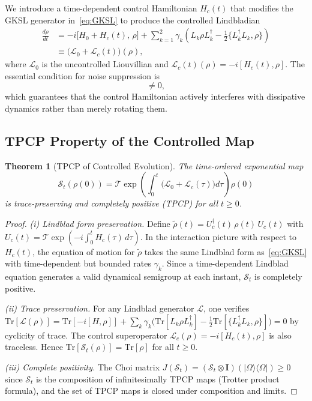 \documentclass[journal,twocolumn]{IEEEtran}
\theoremstyle{definition}
\theoremstyle{plain}
\newtheorem{theorem}{Theorem}[section]
\newcommand{\tensor}{\otimes}
\newcommand{\Tr}{\mathrm{Tr}}
\begin{document}
We introduce a time-dependent control Hamiltonian $H_c(t)$ that
modifies the GKSL generator in~\eqref{eq:GKSL} to produce the
controlled Lindbladian
\begin{align}
  \frac{d\rho}{dt} &= -i\bigl[H_0 + H_c(t),\, \rho\bigr]
  + \sum_{k=1}^2 \gamma_k\!\left(L_k\rho L_k^\dagger
    - \tfrac{1}{2}\{L_k^\dagger L_k, \rho\}\right) \nonumber\\
  &\equiv \bigl(\mathcal{L}_0 + \mathcal{L}_c(t)\bigr)(\rho),
  \label{eq:controlled_dynamics}
\end{align}
where $\mathcal{L}_0$ is the uncontrolled Liouvillian and
$\mathcal{L}_c(t)(\rho) = -i[H_c(t), \rho]$.  The essential
condition for noise suppression is
\begin{equation}
  [\mathcal{L}_0,\, \mathcal{L}_c(t)] \ne 0,
  \label{eq:noncommutativity}
\end{equation}
which guarantees that the control Hamiltonian actively interferes
with dissipative dynamics rather than merely rotating them.

\subsection{TPCP Property of the Controlled Map}

\begin{theorem}[TPCP of Controlled Evolution]
\label{thm:tpcp}
The time-ordered exponential map
\begin{equation}
  \mathcal{S}_t(\rho(0)) = \mathcal{T}\!\exp\!\left(
    \int_0^t \bigl(\mathcal{L}_0 + \mathcal{L}_c(\tau)\bigr)
    d\tau\right)\!\rho(0)
  \label{eq:controlled_evolution}
\end{equation}
is trace-preserving and completely positive (TPCP) for all $t \ge 0$.
\end{theorem}

\begin{proof}
\textit{(i) Lindblad form preservation.}  Define
$\tilde\rho(t) = U_c^\dagger(t)\,\rho(t)\,U_c(t)$ with
$U_c(t) = \mathcal{T}\exp(-i\int_0^t H_c(\tau)\,d\tau)$.  In the
interaction picture with respect to $H_c(t)$, the equation of
motion for $\tilde\rho$ takes the same Lindblad form
as~\eqref{eq:GKSL} with time-dependent but bounded rates $\gamma_k$.
Since a time-dependent Lindblad equation generates a valid dynamical
semigroup at each instant, $\mathcal{S}_t$ is completely positive.

\textit{(ii) Trace preservation.}  For any Lindblad generator
$\mathcal{L}$, one verifies $\Tr[\mathcal{L}(\rho)] =
\Tr[-i[H,\rho]] + \sum_k \gamma_k\bigl(\Tr[L_k\rho L_k^\dagger]
- \tfrac{1}{2}\Tr[\{L_k^\dagger L_k, \rho\}]\bigr) = 0$ by
cyclicity of trace.  The control superoperator
$\mathcal{L}_c(\rho) = -i[H_c(t),\rho]$ is also traceless.
Hence $\Tr[\mathcal{S}_t(\rho)] = \Tr[\rho]$ for all $t \ge 0$.

\textit{(iii) Complete positivity.}  The Choi matrix
$J(\mathcal{S}_t) = (\mathcal{S}_t \tensor \mathbf{I})\!
(|\Omega\rangle\langle\Omega|) \ge 0$ since $\mathcal{S}_t$ is
the composition of infinitesimally TPCP maps (Trotter product
formula), and the set of TPCP maps is closed under composition and
limits.
\end{proof}
\end{document}
